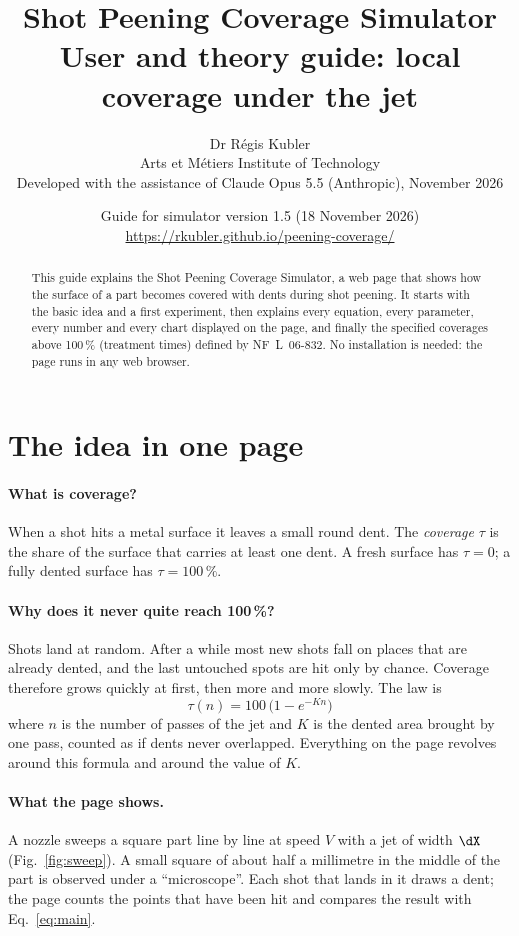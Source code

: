 \documentclass[11pt,a4paper]{article}
\title{\textbf{Shot Peening Coverage Simulator}\\[3pt]
\large User and theory guide: local coverage under the jet}
\author{Dr Régis Kubler\\ Arts et Métiers Institute of Technology\\[4pt]
\small Developed with the assistance of Claude Opus 5.5 (Anthropic), November 2026}
\date{Guide for simulator version 1.5 (18 November 2026)\\ \url{https://rkubler.github.io/peening-coverage/}}
\begin{document}
\maketitle
\thispagestyle{fancy}

\begin{abstract}
\noindent This guide explains the Shot Peening Coverage Simulator, a web page that shows how the surface of a part becomes covered with dents during shot peening. It starts with the basic idea and a first experiment, then explains every equation, every parameter, every number and every chart displayed on the page, and finally the specified coverages above 100\,\% (treatment times) defined by NF~L~06-832. No installation is needed: the page runs in any web browser.
\end{abstract}

\tableofcontents

\section{The idea in one page}

\paragraph{What is coverage?} When a shot hits a metal surface it leaves a small round dent. The \emph{coverage} $\tau$ is the share of the surface that carries at least one dent. A fresh surface has $\tau=0$; a fully dented surface has $\tau=100\,\%$.

\paragraph{Why does it never quite reach 100\,\%?} Shots land at random. After a while most new shots fall on places that are already dented, and the last untouched spots are hit only by chance. Coverage therefore grows quickly at first, then more and more slowly. The law is
\begin{equation}
\boxed{\tau(n)=100\,\bigl(1-e^{-K n}\bigr)}
\label{eq:main}
\end{equation}
where $n$ is the number of passes of the jet and $K$ is the dented area brought by one pass, counted as if dents never overlapped. Everything on the page revolves around this formula and around the value of $K$.

\paragraph{What the page shows.} A nozzle sweeps a square part line by line at speed $V$ with a jet of width $\dX$ (Fig.~\ref{fig:sweep}). A small square of about half a millimetre in the middle of the part is observed under a ``microscope''. Each shot that lands in it draws a dent; the page counts the points that have been hit and compares the result with Eq.~\eqref{eq:main}.
\end{document}
